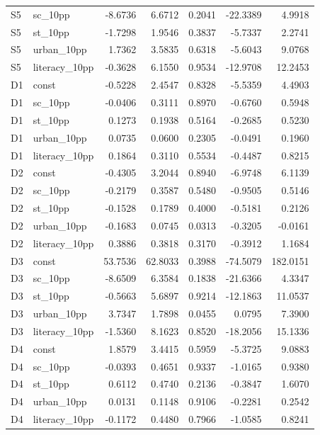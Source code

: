 \documentclass[11pt,a4paper]{report}
\begin{document}
\begin{longtable}{llrrrrr}
S5 & sc\_10pp & -8.6736 & 6.6712 & 0.2041 & -22.3389 & 4.9918 \\
S5 & st\_10pp & -1.7298 & 1.9546 & 0.3837 & -5.7337 & 2.2741 \\
S5 & urban\_10pp & 1.7362 & 3.5835 & 0.6318 & -5.6043 & 9.0768 \\
S5 & literacy\_10pp & -0.3628 & 6.1550 & 0.9534 & -12.9708 & 12.2453 \\
D1 & const & -0.5228 & 2.4547 & 0.8328 & -5.5359 & 4.4903 \\
D1 & sc\_10pp & -0.0406 & 0.3111 & 0.8970 & -0.6760 & 0.5948 \\
D1 & st\_10pp & 0.1273 & 0.1938 & 0.5164 & -0.2685 & 0.5230 \\
D1 & urban\_10pp & 0.0735 & 0.0600 & 0.2305 & -0.0491 & 0.1960 \\
D1 & literacy\_10pp & 0.1864 & 0.3110 & 0.5534 & -0.4487 & 0.8215 \\
D2 & const & -0.4305 & 3.2044 & 0.8940 & -6.9748 & 6.1139 \\
D2 & sc\_10pp & -0.2179 & 0.3587 & 0.5480 & -0.9505 & 0.5146 \\
D2 & st\_10pp & -0.1528 & 0.1789 & 0.4000 & -0.5181 & 0.2126 \\
D2 & urban\_10pp & -0.1683 & 0.0745 & 0.0313 & -0.3205 & -0.0161 \\
D2 & literacy\_10pp & 0.3886 & 0.3818 & 0.3170 & -0.3912 & 1.1684 \\
D3 & const & 53.7536 & 62.8033 & 0.3988 & -74.5079 & 182.0151 \\
D3 & sc\_10pp & -8.6509 & 6.3584 & 0.1838 & -21.6366 & 4.3347 \\
D3 & st\_10pp & -0.5663 & 5.6897 & 0.9214 & -12.1863 & 11.0537 \\
D3 & urban\_10pp & 3.7347 & 1.7898 & 0.0455 & 0.0795 & 7.3900 \\
D3 & literacy\_10pp & -1.5360 & 8.1623 & 0.8520 & -18.2056 & 15.1336 \\
D4 & const & 1.8579 & 3.4415 & 0.5959 & -5.3725 & 9.0883 \\
D4 & sc\_10pp & -0.0393 & 0.4651 & 0.9337 & -1.0165 & 0.9380 \\
D4 & st\_10pp & 0.6112 & 0.4740 & 0.2136 & -0.3847 & 1.6070 \\
D4 & urban\_10pp & 0.0131 & 0.1148 & 0.9106 & -0.2281 & 0.2542 \\
D4 & literacy\_10pp & -0.1172 & 0.4480 & 0.7966 & -1.0585 & 0.8241 \\
\end{longtable}\endgroup
\begingroup\footnotesize\setlength{\tabcolsep}{4pt}
\end{document}
